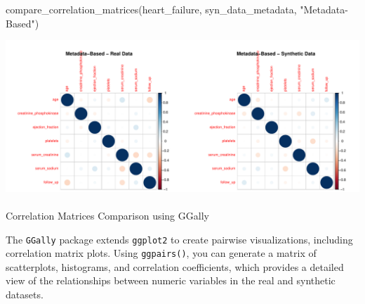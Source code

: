 \documentclass[
  letterpaper,
  DIV=11,
  numbers=noendperiod]{scrartcl}
\makeatletter
\let\oldparagraph\paragraph
\renewcommand{\paragraph}{
    \@ifstar
      \xxxParagraphStar
      \xxxParagraphNoStar
  }
\newcommand{\xxxParagraphStar}[1]{\oldparagraph*{#1}\mbox{}}
\newcommand{\xxxParagraphNoStar}[1]{\oldparagraph{#1}\mbox{}}
\newenvironment{Shaded}{\begin{snugshade}}{\end{snugshade}}
\newcommand{\FunctionTok}[1]{\textcolor[rgb]{0.28,0.35,0.67}{#1}}
\newcommand{\NormalTok}[1]{\textcolor[rgb]{0.00,0.23,0.31}{#1}}
\newcommand{\StringTok}[1]{\textcolor[rgb]{0.13,0.47,0.30}{#1}}
\makeatother
\begin{document}
\begin{Shaded}
\begin{Highlighting}[]
\FunctionTok{compare\_correlation\_matrices}\NormalTok{(heart\_failure, syn\_data\_metadata, }\StringTok{"Metadata{-}Based"}\NormalTok{)}
\end{Highlighting}
\end{Shaded}

\begin{center}
\includegraphics[width=1\linewidth,height=\textheight,keepaspectratio]{heart_failure_synthetic_data_project_files/figure-pdf/Correlation Matrices Comparison using Corrplot-4.pdf}
\end{center}

\paragraph{Correlation Matrices Comparison using
GGally}\label{correlation-matrices-comparison-using-ggally}

The \texttt{GGally} package extends \texttt{ggplot2} to create pairwise
visualizations, including correlation matrix plots. Using
\texttt{ggpairs()}, you can generate a matrix of scatterplots,
histograms, and correlation coefficients, which provides a detailed view
of the relationships between numeric variables in the real and synthetic
datasets.
\end{document}

